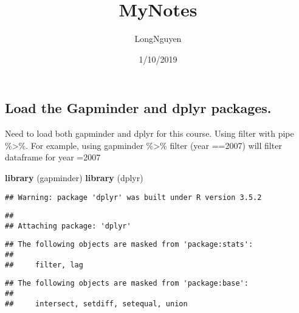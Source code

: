 \documentclass[]{article}
\title{MyNotes}
\author{LongNguyen}
\date{1/10/2019}
\newenvironment{Shaded}{\begin{snugshade}}{\end{snugshade}}
\newcommand{\KeywordTok}[1]{\textcolor[rgb]{0.13,0.29,0.53}{\textbf{#1}}}
\newcommand{\StringTok}[1]{\textcolor[rgb]{0.31,0.60,0.02}{#1}}
\newcommand{\OperatorTok}[1]{\textcolor[rgb]{0.81,0.36,0.00}{\textbf{#1}}}
\newcommand{\NormalTok}[1]{#1}
\begin{document}
\maketitle

\subsection{Load the Gapminder and dplyr
packages.}\label{load-the-gapminder-and-dplyr-packages.}

Need to load both gapminder and dplyr for this course. Using filter with
pipe \%\textgreater{}\%. For example, using gapminder \%\textgreater{}\%
filter (year ==2007) will filter dataframe for year =2007

\begin{Shaded}
\begin{Highlighting}[]
\KeywordTok{library}\NormalTok{ (gapminder)}
\KeywordTok{library}\NormalTok{ (dplyr)}
\end{Highlighting}
\end{Shaded}

\begin{verbatim}
## Warning: package 'dplyr' was built under R version 3.5.2
\end{verbatim}

\begin{verbatim}
## 
## Attaching package: 'dplyr'
\end{verbatim}

\begin{verbatim}
## The following objects are masked from 'package:stats':
## 
##     filter, lag
\end{verbatim}

\begin{verbatim}
## The following objects are masked from 'package:base':
## 
##     intersect, setdiff, setequal, union
\end{verbatim}

\begin{Shaded}
\end{Shaded}
\end{document}
